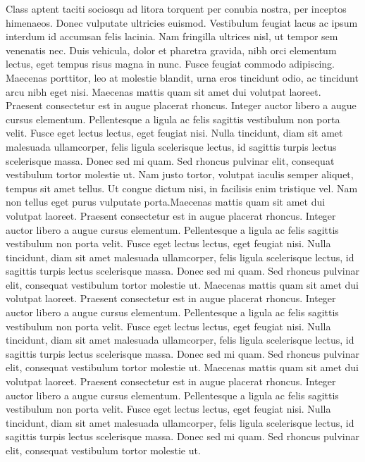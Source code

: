 Class aptent taciti sociosqu ad litora torquent per conubia nostra, per inceptos himenaeos. Donec vulputate ultricies euismod. Vestibulum feugiat lacus ac ipsum interdum id accumsan felis lacinia. Nam fringilla ultrices nisl, ut tempor sem venenatis nec. Duis vehicula, dolor et pharetra gravida, nibh orci elementum lectus, eget tempus risus magna in nunc. Fusce feugiat commodo adipiscing. Maecenas porttitor, leo at molestie blandit, urna eros tincidunt odio, ac tincidunt arcu nibh eget nisi. Maecenas mattis quam sit amet dui volutpat laoreet. Praesent consectetur est in augue placerat rhoncus. Integer auctor libero a augue cursus elementum. Pellentesque a ligula ac felis sagittis vestibulum non porta velit. Fusce eget lectus lectus, eget feugiat nisi. Nulla tincidunt, diam sit amet malesuada ullamcorper, felis ligula scelerisque lectus, id sagittis turpis lectus scelerisque massa. Donec sed mi quam. Sed rhoncus pulvinar elit, consequat vestibulum tortor molestie ut. Nam justo tortor, volutpat iaculis semper aliquet, tempus sit amet tellus. Ut congue dictum nisi, in facilisis enim tristique vel. Nam non tellus eget purus vulputate porta.Maecenas mattis quam sit amet dui volutpat laoreet. Praesent consectetur est in augue placerat rhoncus. Integer auctor libero a augue cursus elementum. Pellentesque a ligula ac felis sagittis vestibulum non porta velit. Fusce eget lectus lectus, eget feugiat nisi. Nulla tincidunt, diam sit amet malesuada ullamcorper, felis ligula scelerisque lectus, id sagittis turpis lectus scelerisque massa. Donec sed mi quam. Sed rhoncus pulvinar elit, consequat vestibulum tortor molestie ut. Maecenas mattis quam sit amet dui volutpat laoreet. Praesent consectetur est in augue placerat rhoncus. Integer auctor libero a augue cursus elementum. Pellentesque a ligula ac felis sagittis vestibulum non porta velit. Fusce eget lectus lectus, eget feugiat nisi. Nulla tincidunt, diam sit amet malesuada ullamcorper, felis ligula scelerisque lectus, id sagittis turpis lectus scelerisque massa. Donec sed mi quam. Sed rhoncus pulvinar elit, consequat vestibulum tortor molestie ut. Maecenas mattis quam sit amet dui volutpat laoreet. Praesent consectetur est in augue placerat rhoncus. Integer auctor libero a augue cursus elementum. Pellentesque a ligula ac felis sagittis vestibulum non porta velit. Fusce eget lectus lectus, eget feugiat nisi. Nulla tincidunt, diam sit amet malesuada ullamcorper, felis ligula scelerisque lectus, id sagittis turpis lectus scelerisque massa. Donec sed mi quam. Sed rhoncus pulvinar elit, consequat vestibulum tortor molestie ut. 

